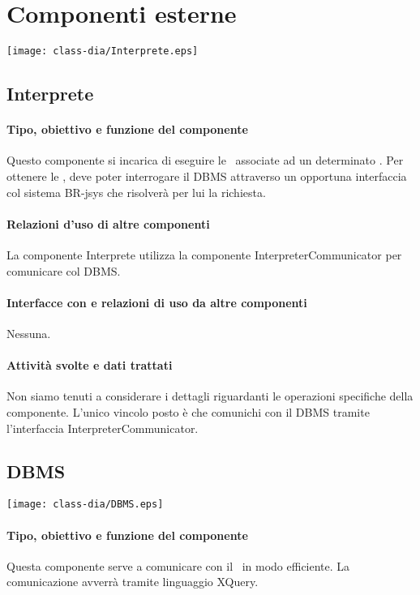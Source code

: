 \chapter{Componenti esterne}
\begin{center}
 \texttt{[image: class-dia/Interprete.eps]}
\end{center}
\section{Interprete}
\subsubsection{Tipo, obiettivo e funzione del componente}
Questo componente si incarica di eseguire le \brs\ associate ad un determinato \bo. Per ottenere le \brs, deve poter interrogare il DBMS attraverso un opportuna interfaccia col sistema BR-jsys che risolver\`a per lui la richiesta.
\subsubsection{Relazioni d'uso di altre componenti}
La componente Interprete utilizza la componente InterpreterCommunicator per comunicare col DBMS.
\subsubsection{Interfacce con e relazioni di uso da altre componenti}
Nessuna.
\subsubsection{Attivit\`a svolte e dati trattati}
Non siamo tenuti a considerare i dettagli riguardanti le operazioni specifiche della componente. L'unico vincolo posto \`e che comunichi con il DBMS tramite l'interfaccia InterpreterCommunicator.
\section{DBMS}
\begin{center}
 \texttt{[image: class-dia/DBMS.eps]}
\end{center}
\subsubsection{Tipo, obiettivo e funzione del componente}
Questa componente serve a comunicare con il \rp\ in modo efficiente. La comunicazione avverr\`a tramite linguaggio XQuery.
